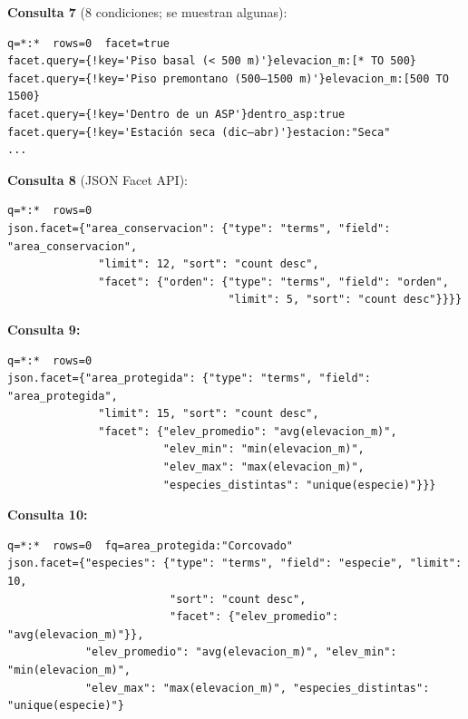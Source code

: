 \documentclass[11pt,a4paper]{article}
\newenvironment{bloque}[1]%
  {\par\medskip\noindent\begin{minipage}{\linewidth}#1}%
  {\end{minipage}\par\medskip}
\begin{document}
\begin{bloque}{\textbf{Consulta 7} (8 condiciones; se muestran algunas):}
\begin{lstlisting}
q=*:*  rows=0  facet=true
facet.query={!key='Piso basal (< 500 m)'}elevacion_m:[* TO 500}
facet.query={!key='Piso premontano (500–1500 m)'}elevacion_m:[500 TO 1500}
facet.query={!key='Dentro de un ASP'}dentro_asp:true
facet.query={!key='Estación seca (dic–abr)'}estacion:"Seca"
...
\end{lstlisting}
\end{bloque}

\begin{bloque}{\textbf{Consulta 8} (JSON Facet API):}
\begin{lstlisting}
q=*:*  rows=0
json.facet={"area_conservacion": {"type": "terms", "field": "area_conservacion",
              "limit": 12, "sort": "count desc",
              "facet": {"orden": {"type": "terms", "field": "orden",
                                  "limit": 5, "sort": "count desc"}}}}
\end{lstlisting}
\end{bloque}

\begin{bloque}{\textbf{Consulta 9:}}
\begin{lstlisting}
q=*:*  rows=0
json.facet={"area_protegida": {"type": "terms", "field": "area_protegida",
              "limit": 15, "sort": "count desc",
              "facet": {"elev_promedio": "avg(elevacion_m)",
                        "elev_min": "min(elevacion_m)",
                        "elev_max": "max(elevacion_m)",
                        "especies_distintas": "unique(especie)"}}}
\end{lstlisting}
\end{bloque}

\begin{bloque}{\textbf{Consulta 10:}}
\begin{lstlisting}
q=*:*  rows=0  fq=area_protegida:"Corcovado"
json.facet={"especies": {"type": "terms", "field": "especie", "limit": 10,
                         "sort": "count desc",
                         "facet": {"elev_promedio": "avg(elevacion_m)"}},
            "elev_promedio": "avg(elevacion_m)", "elev_min": "min(elevacion_m)",
            "elev_max": "max(elevacion_m)", "especies_distintas": "unique(especie)"}
\end{lstlisting}
\end{bloque}
\end{document}
